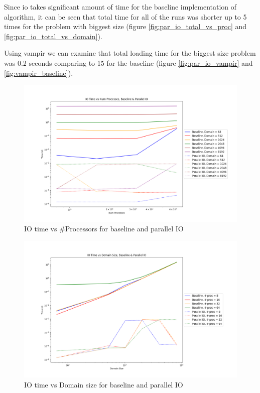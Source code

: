 \begin{enumerate}
  Since io takes significant amount of time for the baseline implementation of algorithm, it can be seen that 
  total time for all of the runs was shorter up to 5 times for the problem with biggest size (figure 
  \ref{fig:par_io_total_vs_proc} and \ref{fig:par_io_total_vs_domain}).

  Using vampir we can examine that total loading time for the biggest size problem was 0.2 seconds comparing to 15 
  for the baseline (figure \ref{fig:par_io_vampir} and \ref{fig:vampir_baseline}).

  \begin{figure}[p] %
    \begin{center}
      \includegraphics[width=.9\linewidth]{Figures/io/io_multdomain_haswell_io_baseline.png} %
      \caption{IO time vs \#Processors for baseline and parallel IO}
      \label{fig:par_io_io_vs_proc}
    \end{center}
 \end{figure}
 
 
 \begin{figure}[p] %
  \begin{center}
    \includegraphics[width=.9\linewidth]{Figures/io/io_multproc_haswell_io_baseline.png} %
    \caption{IO time vs Domain size for baseline and parallel IO}
    \label{fig:par_io_io_vs_domain}
  \end{center}
\end{figure}
 


\end{enumerate}
